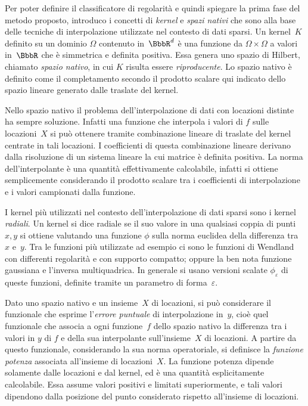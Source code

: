 Per poter definire il classificatore di regolarità e quindi spiegare la prima fase del metodo proposto, introduco i concetti di {\em kernel} e {\em spazi nativi} che sono alla base delle tecniche di interpolazione utilizzate nel contesto di dati sparsi.
Un kernel~$K$ definito su un dominio $\Omega$ contenuto in~$\R^d$ è una funzione da $\Omega{\times}\Omega$ a valori in~$\R$ che è simmetrica e definita positiva.  Essa genera uno spazio di Hilbert, chiamato {\em spazio nativo}, in cui $K$ risulta essere {\em riproducente}.
Lo spazio nativo è definito come il completamento  secondo il prodotto scalare qui  indicato dello spazio lineare generato dalle traslate del kernel.

Nello spazio nativo il problema dell'interpolazione di dati con locazioni distinte ha sempre soluzione.  Infatti una funzione che interpola i valori di $f$ sulle locazioni~$X$ si può ottenere tramite combinazione lineare di traslate del kernel centrate in tali locazioni.   I coefficienti di questa combinazione lineare derivano dalla risoluzione di un sistema lineare la cui matrice è definita positiva.
 La norma dell’interpolante  è una quantità effettivamente calcolabile, infatti si ottiene semplicemente considerando il prodotto scalare tra i coefficienti di interpolazione e i valori campionati dalla funzione.





I kernel più utilizzati nel contesto dell'interpolazione di dati sparsi sono i kernel {\em radiali}.  Un kernel si dice radiale se il suo valore in una qualsiasi coppia di punti $x,y$ si ottiene valutando una funzione $\phi$ sulla norma euclidea della differenza tra $x$ e~$y$.  
Tra le funzioni più utilizzate ad esempio ci sono le funzioni di Wendland con differenti regolarità e con supporto compatto; oppure la ben nota funzione gaussiana e l'inversa multiquadrica.
In generale si usano versioni scalate $\phi_\varepsilon$ di queste funzioni, definite tramite un parametro di forma~$\varepsilon$.



Dato uno spazio nativo e un insieme~$X$ di locazioni, si può considerare il funzionale che esprime l'{\em errore puntuale} di interpolazione in~$y$, cioè quel funzionale che associa a ogni funzione~$f$ dello spazio nativo la differenza tra i valori in $y$ di $f$ e della sua interpolante sull'insieme~$X$ di locazioni.  A partire da questo funzionale, considerando la sua norma operatoriale, si definisce la {\em funzione potenza} associata all'insieme di locazioni~$X$.  La funzione potenza dipende solamente dalle locazioni e dal kernel, ed è una quantità esplicitamente calcolabile.  Essa assume valori positivi e limitati superiormente, e tali valori dipendono dalla posizione del punto considerato rispetto all'insieme di locazioni.

